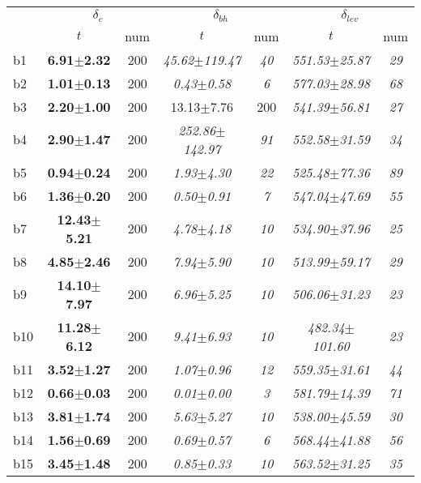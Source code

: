 \begin{longtable}{|l|c|c|c|c|c|c|}
\hline
&\multicolumn{2}{c|}{$\delta_c$}&\multicolumn{2}{c|}{$\delta_{bh}$}&\multicolumn{2}{c|}{$\delta_{lev}$}\\
\cline{2-7}
&$t$&num&$t$&num&$t$&num\\
\hline
b1&\textbf{6.91$\pm$2.32} & 200 &\textit{45.62$\pm$119.47} & \textit{40 }&\textit{551.53$\pm$25.87} & \textit{29 }
\\
b2&\textbf{1.01$\pm$0.13} & 200 &\textit{0.43$\pm$0.58} & \textit{6 }&\textit{577.03$\pm$28.98} & \textit{68 }
\\
b3&\textbf{2.20$\pm$1.00} & 200 &13.13$\pm$7.76 & 200 &\textit{541.39$\pm$56.81} & \textit{27 }
\\
b4&\textbf{2.90$\pm$1.47} & 200 &\textit{252.86$\pm$142.97} & \textit{91 }&\textit{552.58$\pm$31.59} & \textit{34 }
\\
b5&\textbf{0.94$\pm$0.24} & 200 &\textit{1.93$\pm$4.30} & \textit{22 }&\textit{525.48$\pm$77.36} & \textit{89 }
\\
b6&\textbf{1.36$\pm$0.20} & 200 &\textit{0.50$\pm$0.91} & \textit{7 }&\textit{547.04$\pm$47.69} & \textit{55 }
\\
b7&\textbf{12.43$\pm$5.21} & 200 &\textit{4.78$\pm$4.18} & \textit{10 }&\textit{534.90$\pm$37.96} & \textit{25 }
\\
b8&\textbf{4.85$\pm$2.46} & 200 &\textit{7.94$\pm$5.90} & \textit{10 }&\textit{513.99$\pm$59.17} & \textit{29 }
\\
b9&\textbf{14.10$\pm$7.97} & 200 &\textit{6.96$\pm$5.25} & \textit{10 }&\textit{506.06$\pm$31.23} & \textit{23 }
\\
b10&\textbf{11.28$\pm$6.12} & 200 &\textit{9.41$\pm$6.93} & \textit{10 }&\textit{482.34$\pm$101.60} & \textit{23 }
\\
b11&\textbf{3.52$\pm$1.27} & 200 &\textit{1.07$\pm$0.96} & \textit{12 }&\textit{559.35$\pm$31.61} & \textit{44 }
\\
b12&\textbf{0.66$\pm$0.03} & 200 &\textit{0.01$\pm$0.00} & \textit{3 }&\textit{581.79$\pm$14.39} & \textit{71 }
\\
b13&\textbf{3.81$\pm$1.74} & 200 &\textit{5.63$\pm$5.27} & \textit{10 }&\textit{538.00$\pm$45.59} & \textit{30 }
\\
b14&\textbf{1.56$\pm$0.69} & 200 &\textit{0.69$\pm$0.57} & \textit{6 }&\textit{568.44$\pm$41.88} & \textit{56 }
\\
b15&\textbf{3.45$\pm$1.48} & 200 &\textit{0.85$\pm$0.33} & \textit{10 }&\textit{563.52$\pm$31.25} & \textit{35 }
\\

\end{longtable}
